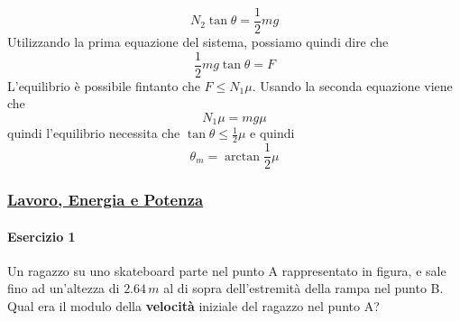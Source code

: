 \begin{equation*}
  N_2\tan\theta = \frac{1}{2}mg
\end{equation*}
Utilizzando la prima equazione del sistema, possiamo quindi dire che
\begin{equation*}
  \frac{1}{2}mg\tan\theta=F
\end{equation*}
L'equilibrio è possibile fintanto che $F\leq N_1\mu$. Usando la seconda equazione viene che
\begin{equation*}
  N_1\mu = mg\mu
\end{equation*}
quindi l'equilibrio necessita che $\tan\theta\leq\frac{1}{2}\mu$ e quindi
\begin{equation*}
  \boxed{\theta_m = \arctan\frac{1}{2}\mu}
\end{equation*}

\subsubsection*{\hyperref[subsec:dinamica:potenziale]{Lavoro, Energia e Potenza}}\label{ex:potenziale}
\paragraph{Esercizio 1}
Un ragazzo su uno skateboard parte nel punto A rappresentato in figura, e sale fino ad un'altezza
di $2.64\,m$ al di sopra dell'estremità della rampa nel punto B. Qual era il modulo della
\textbf{velocità} iniziale del ragazzo nel punto A?

\begin{center}
\end{center}
\divisor

